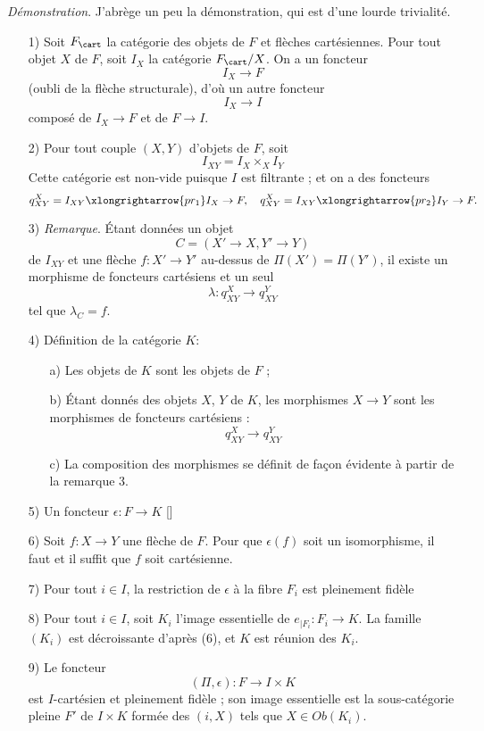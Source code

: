 {\it Démonstration}. J'abrège un peu la démonstration, qui est d'une lourde trivialité. 
\begin{enumerate}
    \item[1)] Soit $F_{\cart}$ la catégorie des objets de $F$ et flèches cartésiennes. Pour tout objet $X$ de $F$, soit $I_X$ la catégorie $F_{\cart}/X$. On a un foncteur
    $$
    I_X \to F
    $$
    (oubli de la flèche structurale), d'où un autre foncteur
    $$
    I_X \to I
    $$
    composé de $I_X \to F$ et de $F \to I$.
    \item[2)] Pour tout couple $(X, Y)$ d'objets de $F$, soit
    $$
    I_{XY} = I_{X} \times_X I_Y
    $$
    Cette catégorie est non-vide puisque $I$ est filtrante ; et on a des foncteurs 
    $$
    q^X_{XY} = I_{XY} \xlongrightarrow{pr_1} I_X \to F, \quad q^X_{XY} = I_{XY} \xlongrightarrow{pr_2} I_Y \to F.
    $$
    \item[3)] \emph{Remarque}. Étant données un objet
    $$
    C = (X' \to X, Y' \to Y)
    $$
    de $I_{XY}$ et une flèche $f: X' \to Y'$ au-dessus de $\Pi(X') = \Pi(Y')$, il existe un morphisme de foncteurs cartésiens et un seul
    $$
    \lambda: q^X_{XY} \to q^Y_{XY}
    $$
    tel que $\lambda_C = f$.
    \item[4)] Définition de la catégorie $K$:
    \begin{enumerate}
        \item[a)] Les objets de $K$ sont les objets de $F$ ;
        \item[b)] Étant donnés des objets $X$, $Y$ de $K$, les morphismes $X \to Y$ sont les morphismes de foncteurs cartésiens :
        $$
        q^X_{XY} \to q^Y_{XY}
        $$
        \item[c)] La composition des morphismes se définit de fa\c{c}on évidente à partir de la remarque 3.
    \end{enumerate}
    \item[5)] Un foncteur $\epsilon: F \to K$ 
    []
    \item[6)] Soit $f: X \to Y$ une flèche de $F$. Pour que $\epsilon(f)$ soit un isomorphisme, il faut et il suffit que $f$ soit cartésienne.
    \item[7)] Pour tout $i \in I$, la restriction de $\epsilon$ à la fibre $F_i$ est pleinement fidèle
    \item[8)] Pour tout $i \in I$, soit $K_i$ l'image essentielle de $e_{| F_i}: F_i \to K$. La famille $(K_i)$ est décroissante d'après (6), et $K$ est réunion des $K_i$.
    \item[9)] Le foncteur
    $$
    (\Pi, \epsilon): F \to I \times K
    $$
    est $I$-cartésien et pleinement fidèle ; son image essentielle est la sous-catégorie pleine $F'$ de $I \times K$ formée des $(i, X)$ tels que $X \in Ob(K_i)$.
\end{enumerate}

